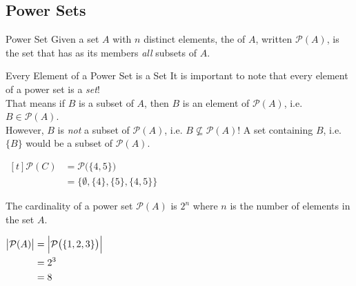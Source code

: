 \documentclass[\main/notes.tex]{subfiles}
\begin{document}
			\subsection{Power Sets}
				\begin{definition}{Power Set}
					Given a set $A$ with $n$ distinct elements, the  of $A$, written $\mathcal{P}(A)$, is the set that has as its members \emph{all} subsets of $A$.
				\end{definition}
				\nopagebreak
				\begin{sidenote}{Every Element of a Power Set is a Set}
					It is important to note that every element of a power set is a \emph{set}!\\ That means if $B$ is a subset of $A$, then $B$ is an element of $\mathcal{P}(A)$, i.e. $B \in \mathcal{P}(A)$.\\
					However, $B$ is \emph{not} a subset of $\mathcal{P}(A)$, i.e. $B \nsubseteq \mathcal{P}(A)$! A set containing $B$, i.e. $\{B\}$ would be a subset of $\mathcal{P}(A)$.
				\end{sidenote}
				\nopagebreak
				\begin{example}[hbox] $
					\begin{aligned}[t]
						\mathcal{P}(C) &= \mathcal{P}\bigl(\{4, 5\}\bigr)\\
						&= \bigl\{\emptyset, \{4\}, \{5\}, \{4, 5\}\bigr\}
					\end{aligned} $
				\end{example}
				The cardinality of a power set $\mathcal{P}(A)$ is $2^{n}$ where $n$ is the number of elements in the set $A$.
				\begin{example}[hbox] $
					\begin{aligned}[t]
						\bigl\lvert \mathcal{P}(A)\bigr\rvert &= \Bigl\lvert\mathcal{P}\bigl(\{1, 2, 3\}\bigr)\Bigr\rvert\\
						&= 2^{3}\\
						&= 8
					\end{aligned} $
				\end{example}
			\pagebreak
\end{document}
